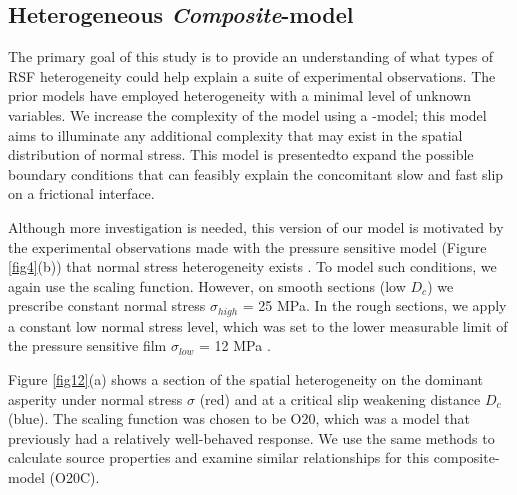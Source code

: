 \documentclass[preprint,1p, 10pt,authoryear]{elsarticle}
\begin{document}
\subsection{Heterogeneous \textit{Composite}-model}
The primary goal of this study is to provide an understanding of what types of RSF heterogeneity could help explain a suite of experimental observations. The prior models have employed heterogeneity with a minimal level of unknown variables. We increase the complexity of the model using a -model; this model aims to illuminate any additional complexity that may exist in the spatial distribution of normal stress. This model is presentedto expand the possible boundary conditions that can feasibly explain the concomitant slow and fast slip on a frictional interface. 

Although more investigation is needed, this version of our model is motivated by the experimental observations made with the pressure sensitive model (Figure \ref{fig4}(b)) that normal stress heterogeneity exists \citep{Selvadurai2017}. To model such conditions, we again use the scaling function. However, on smooth sections (low $D_{c}$) we prescribe constant normal stress $\sigma_{high}$ = 25 MPa.  In the rough sections, we apply a constant low normal stress level, which was set to the lower measurable limit of the pressure sensitive film $\sigma_{low}$ = 12 MPa \citep{Selvadurai2015a}. 

Figure \ref{fig12}(a) shows a section of the spatial heterogeneity on the dominant asperity under normal stress $\sigma$ (red) and at a critical slip weakening distance $D_{c}$ (blue).  The scaling function was chosen to be O20, which was a model that previously had a relatively well-behaved response.  We use the same methods to calculate source properties and examine similar relationships for this composite-model (O20C).
\end{document}

